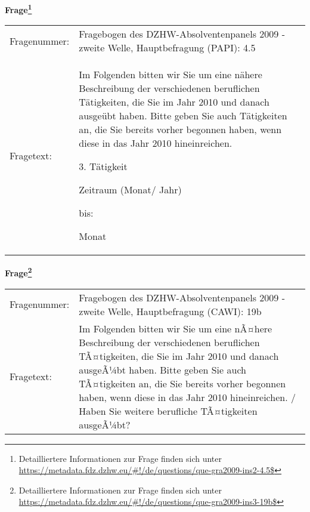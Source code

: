 				\vspace*{0.5cm}
                \noindent\textbf{Frage\footnote{Detailliertere Informationen zur Frage finden sich unter
		              \url{https://metadata.fdz.dzhw.eu/\#!/de/questions/que-gra2009-ins2-4.5$}}}\\
				\begin{tabularx}{\hsize}{@{}lX}
					Fragenummer: &
					  Fragebogen des DZHW-Absolventenpanels 2009 - zweite Welle, Hauptbefragung (PAPI):
					  4.5
 \\
					Fragetext: & Im Folgenden bitten wir Sie um eine nähere Beschreibung der verschiedenen beruflichen Tätigkeiten, die Sie im Jahr 2010 und danach ausgeübt haben. Bitte geben Sie auch Tätigkeiten an, die Sie bereits vorher begonnen haben, wenn diese in das Jahr 2010 hineinreichen.\par  3. Tätigkeit\par  Zeitraum (Monat/ Jahr)\par  bis:\par  Monat \\
				\end{tabularx}
				\vspace*{0.5cm}
                \noindent\textbf{Frage\footnote{Detailliertere Informationen zur Frage finden sich unter
		              \url{https://metadata.fdz.dzhw.eu/\#!/de/questions/que-gra2009-ins3-19b$}}}\\
				\begin{tabularx}{\hsize}{@{}lX}
					Fragenummer: &
					  Fragebogen des DZHW-Absolventenpanels 2009 - zweite Welle, Hauptbefragung (CAWI):
					  19b
 \\
					Fragetext: & Im Folgenden bitten wir Sie um eine nÃ¤here Beschreibung der verschiedenen beruflichen TÃ¤tigkeiten, die Sie im Jahr 2010 und danach ausgeÃ¼bt haben. Bitte geben Sie auch TÃ¤tigkeiten an, die Sie bereits vorher begonnen haben, wenn diese in das Jahr 2010 hineinreichen. / Haben Sie weitere berufliche TÃ¤tigkeiten ausgeÃ¼bt? \\
				\end{tabularx}





